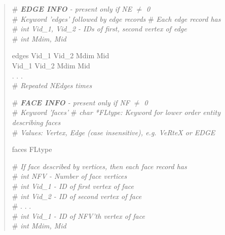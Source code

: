 \documentclass[12pt]{article}
\begin{document}
\begin{verse}
\# \textit{\textbf{EDGE INFO} - present only if NE $\ne$ 0} \\
\# \textit{Keyword 'edges' followed by edge records}
\# \textit{Each edge record has} \\
\# \textit{\textit{int} Vid\_1, Vid\_2  - IDs of first, second vertex of edge} \\
\# \textit{\textit{int} Mdim, Mid}
\vspace{1ex}

edges
Vid\_1 \hspace{0.5ex} Vid\_2 \hspace{0.5ex} Mdim \hspace{0.5ex} Mid \\
Vid\_1 \hspace{0.5ex} Vid\_2 \hspace{0.5ex} Mdim \hspace{0.5ex} Mid \\
. . . \\
\# \textit{Repeated NEdges times}
\vspace{2ex}

\newpage
\# \textit{\textbf{FACE INFO} - present only if NF $\ne$ 0} \\
\# \textit{Keyword 'faces'}
\# \textit{char *FLtype: Keyword for lower order entity describing faces} \\
\# \textit{Values: Vertex, Edge (case insensitive), e.g. VeRteX or EDGE} \\
\vspace{1ex}

faces FLtype 
\vspace{1ex}

\# \textit{If face described by vertices, then each face record has} \\
\# \textit{\textit{int} NFV - Number of face vertices} \\
\# \textit{\textit{int} Vid\_1 - ID of first vertex of face} \\
\# \textit{\textit{int} Vid\_2 - ID of second vertex of face} \\
\# . . . \\
\# \textit{\textit{int} Vid\_1 - ID of NFV'th vertex of face} \\
\# \textit{\textit{int} Mdim, Mid} 
\vspace{1ex}


\end{verse}
\end{document}
